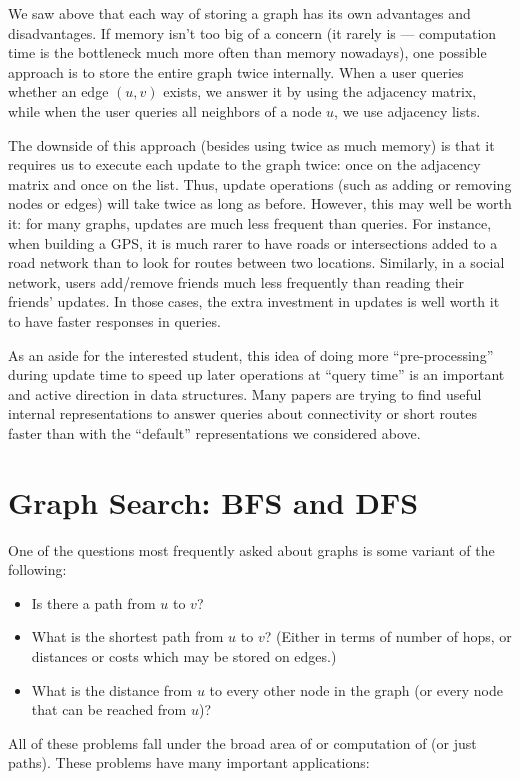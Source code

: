 We saw above that each way of storing a graph has its own advantages
and disadvantages. If memory isn't too big of a concern (it rarely is
--- computation time is the bottleneck much more often than memory
nowadays), one possible approach is to store the entire graph twice
internally. When a user queries whether an edge $(u,v)$ exists, we
answer it by using the adjacency matrix, while when the user queries
all neighbors of a node $u$, we use adjacency lists.

The downside of this approach (besides using twice as much memory) is
that it requires us to execute each update to the graph twice: once
on the adjacency matrix and once on the list.
Thus, update operations (such as adding or removing nodes or edges)
will take twice as long as before.
However, this may well be worth it: for many graphs, updates are much
less frequent than queries. For instance, when building a GPS, it is
much rarer to have roads or intersections added to a road network than
to look for routes between two locations.
Similarly, in a social network, users add/remove friends much less
frequently than reading their friends' updates.
In those cases, the extra investment in updates is well worth it to
have faster responses in queries.

As an aside for the interested student, this idea of doing more
``pre-processing'' during update time to speed up later operations at
``query time'' is an important and active direction in data
structures. Many papers are trying to find useful internal
representations to answer queries about connectivity or short routes
faster than with the ``default'' representations we considered above.

\section{Graph Search: BFS and DFS}
One of the questions most
frequently asked about graphs is some variant of the following:
\begin{itemize}
\item Is there a path from $u$ to $v$?
\item What is the shortest path from $u$ to $v$? (Either in terms of
  number of hops, or distances or costs which may be stored on edges.)
\item What is the distance from $u$ to every other node in the graph
  (or every node that can be reached from $u$)?
\end{itemize}

All of these problems fall under the broad area of 
or computation of  (or just paths). These
problems have many important applications:

